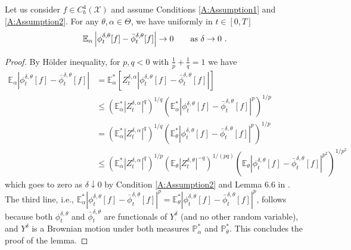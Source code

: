 \documentclass{article}
\begin{document}
\begin{lemma}
 \label{L:FilterConvergence4}
Let us consider $f\in C^{4}_{b}(\mathcal X)$ and assume  Conditions \ref{A:Assumption1} and \ref{A:Assumption2}. For any $\theta,\alpha\in\Theta$, we have uniformly in $t\in[0,T]$
\[
\mathbb E_{\alpha}\left|\phi_t^{\delta,\theta}[f]-\bar{\phi}_t^{\delta,\theta}[f]\right|\rightarrow 0\qquad\hbox{as }\delta\rightarrow0\ .
\]

\end{lemma}
\begin{proof}
By H\"{o}lder inequality, for $p,q<0$ with $\frac 1p+\frac 1q=1$ we have
\begin{align}
\mathbb E_{\alpha}\left|\phi_t^{\delta,\theta}[f]-\bar{\phi}_t^{\delta,\theta}[f]\right|&=
\mathbb E^{*}_{\alpha}\left[Z^{\delta,\alpha}_{t}\left|\phi_t^{\delta,\theta}[f]-\bar{\phi}_t^{\delta,\theta}[f]\right|\right]\nonumber\\
&\leq
 \left(\mathbb E^{*}_{\alpha}\left|Z^{\delta,\alpha}_{t}\right|^{q}\right)^{1/q}\left(\mathbb E^{*}_{\alpha}\left|\phi_t^{\delta,\theta}[f]-\bar{\phi}_t^{\delta,\theta}[f]\right|^{p}\right)^{1/p}\nonumber\\
&=
 \left(\mathbb E^{*}_{\alpha}\left|Z^{\delta,\alpha}_{t}\right|^{q}\right)^{1/q}\left(\mathbb E^{*}_{\theta}\left|\phi_t^{\delta,\theta}[f]-\bar{\phi}_t^{\delta,\theta}[f]\right|^{p}\right)^{1/p}\nonumber\\
 &\leq
 \left(\mathbb E^{*}_{\alpha}\left|Z^{\delta,\alpha}_{t}\right|^{q}\right)^{1/p} \left(\mathbb E_{\theta}\left|Z^{\delta,\theta}_{t}\right|^{-q}\right)^{1/(pq)}\left(\mathbb E_{\theta}\left|\phi_t^{\delta,\theta}[f]-\bar{\phi}_t^{\delta,\theta}[f]\right|^{p^{2}}\right)^{1/p^{2}}\nonumber
\end{align}
which goes to zero as $\delta\downarrow 0$ by Condition \ref{A:Assumption2} and Lemma 6.6 in \cite{ImkellerSriPerkowskiYeong2012}. The third line,  i.e., $\mathbb E_{\alpha}^*\left|\phi_t^{\delta,\theta}[f]-\bar{\phi}_t^{\delta,\theta}[f]\right|^{p}=\mathbb E_{\theta}^*\left|\phi_t^{\delta,\theta}[f]-\bar{\phi}_t^{\delta,\theta}[f]\right|^{p}$, follows because both $\phi_t^{\delta,\theta}$ and $\bar\phi_t^{\delta,\theta}$ are functionals of $Y^\delta_{\cdot}$ (and no other random variable), and $Y^\delta$ is a Brownian motion under both measures $\mathbb P_{\alpha}^*$ and $\mathbb{P}_{\theta}^*$. This concludes the proof of the lemma.
\end{proof}


\end{document}
